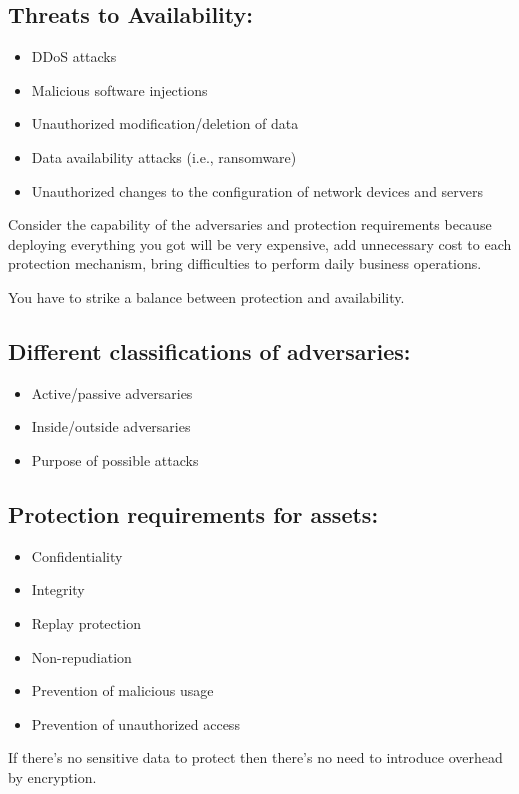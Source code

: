 \documentclass[12pt]{article}
\begin{document}
\subsection*{Threats to Availability:}
\begin{itemize}
    \item DDoS attacks
    \item Malicious software injections
    \item Unauthorized modification/deletion of data
    \item Data availability attacks (i.e., ransomware)
    \item Unauthorized changes to the configuration of network devices and servers
\end{itemize}

Consider the capability of the adversaries and protection requirements because deploying everything you got will be very expensive, add unnecessary cost to each protection mechanism, bring difficulties to perform daily business operations.

You have to strike a balance between protection and availability.

\subsection*{Different classifications of adversaries:}
\begin{itemize}
    \item Active/passive adversaries
    \item Inside/outside adversaries
    \item Purpose of possible attacks
\end{itemize}

\subsection*{Protection requirements for assets:}
\begin{itemize}
    \item Confidentiality
    \item Integrity
    \item Replay protection
    \item Non-repudiation
    \item Prevention of malicious usage
    \item Prevention of unauthorized access
\end{itemize}

If there's no sensitive data to protect then there's no need to introduce overhead by encryption.
\end{document}
